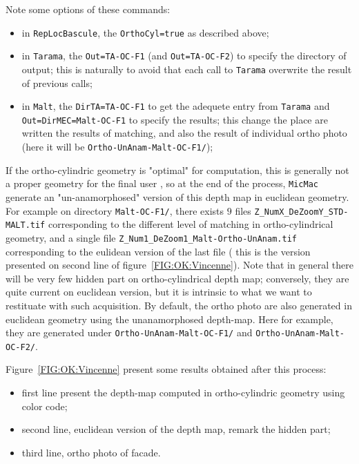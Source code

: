 Note some options of these commands:

\begin{itemize}
   \item in {\tt RepLocBascule}, the {\tt OrthoCyl=true} as described above;
   \item in {\tt Tarama}, the {\tt Out=TA-OC-F1} (and {\tt Out=TA-OC-F2}) to specify the
         directory of output; this is naturally to avoid that each call to {\tt Tarama} overwrite
         the result of previous calls;
   \item in {\tt Malt}, the {\tt DirTA=TA-OC-F1} to get the adequete entry from  {\tt Tarama} 
         and {\tt Out=DirMEC=Malt-OC-F1} to specify the results; this change the place are written
         the results of matching, and also the result of individual ortho photo (here it will be 
         {\tt Ortho-UnAnam-Malt-OC-F1/});
\end{itemize}


If the ortho-cylindric geometry is "optimal" for computation, this is 
generally not a proper geometry for the final user , so at the end of the process,
{\tt MicMac} generate an "un-anamorphosed" version of this depth map in
euclidean geometry.  For example on directory {\tt Malt-OC-F1/}, there
exists $9$ files {\tt Z\_NumX\_DeZoomY\_STD-MALT.tif} corresponding to
the different level of matching in ortho-cylindrical geometry, 
and a single file {\tt Z\_Num1\_DeZoom1\_Malt-Ortho-UnAnam.tif}
corresponding to the eulidean version of the last file
( this is the version presented on second line of
figure~\ref{FIG:OK:Vincenne}).
Note that in general there will be very few hidden part on 
ortho-cylindrical depth map; conversely, they are quite current on
euclidean version, but it is intrinsic to what we want to restituate
with such acquisition.
By default, the ortho photo are also generated in euclidean geometry
using the unanamorphosed depth-map. Here for example, they are
generated under {\tt Ortho-UnAnam-Malt-OC-F1/} and {\tt Ortho-UnAnam-Malt-OC-F2/}.


Figure~\ref{FIG:OK:Vincenne} present some results obtained after this process:

\begin{itemize}
    \item first line present the depth-map computed in ortho-cylindric geometry using
           color code;
    \item  second line, euclidean version of the depth map, remark the hidden part;

    \item  third line, ortho photo of facade.
\end{itemize}

